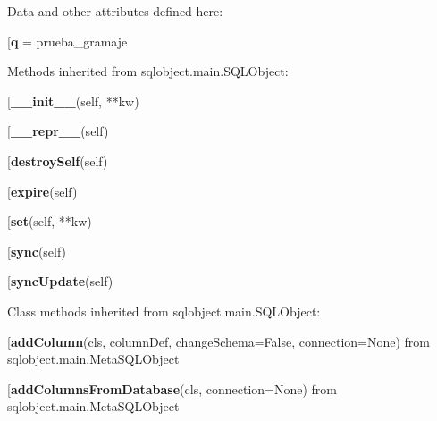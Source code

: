 Data and other attributes defined here:\\
\begin{description}\item[{\bf q} = prueba\_gramaje\end{description}


Methods inherited from sqlobject.main.SQLObject:\\
\begin{description}\item[{\bf \_\_init\_\_}(self, **kw)\end{description}

\begin{description}\item[{\bf \_\_repr\_\_}(self)\end{description}

\begin{description}\item[{\bf destroySelf}(self)\end{description}

\begin{description}\item[{\bf expire}(self)\end{description}

\begin{description}\item[{\bf set}(self, **kw)\end{description}

\begin{description}\item[{\bf sync}(self)\end{description}

\begin{description}\item[{\bf syncUpdate}(self)\end{description}


Class methods inherited from sqlobject.main.SQLObject:\\
\begin{description}\item[{\bf addColumn}(cls, columnDef, changeSchema=False, connection=None) from sqlobject.main.MetaSQLObject\end{description}

\begin{description}\item[{\bf addColumnsFromDatabase}(cls, connection=None) from sqlobject.main.MetaSQLObject\end{description}

